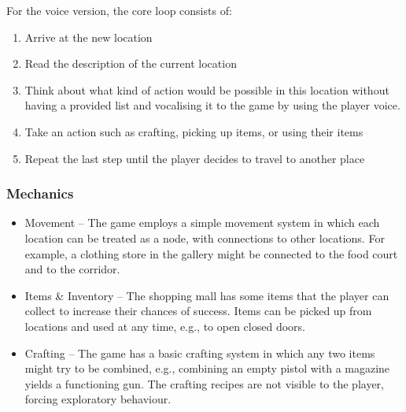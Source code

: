 For the voice version, the core loop consists of:

\begin{enumerate}

    \item Arrive at the new location

    \item Read the description of the current location

    \item Think about what kind of action would be possible in this location without having a provided list and vocalising it to the game by using the player voice.

    \item Take an action such as crafting, picking up items, or using their items

    \item Repeat the last step until the player decides to travel to another place 

\end{enumerate}









\subsubsection{Mechanics}


\begin{itemize}
    \item Movement -- The game employs a simple movement system in which each location can be treated as a node, 
    with connections to other locations. 
    For example, a clothing store in the gallery might be connected to the food court and to the corridor.

    \item Items \& Inventory -- The shopping mall has some items that the player can collect to increase their chances of success. Items can be picked up from locations and used at any time, e.g., to open closed doors.

    \item Crafting -- The game has a basic crafting system in which any two items might try to be combined, e.g., combining an empty pistol with a magazine yields a functioning gun. The crafting recipes are not visible to the player, forcing exploratory behaviour.

    

\end{itemize}







